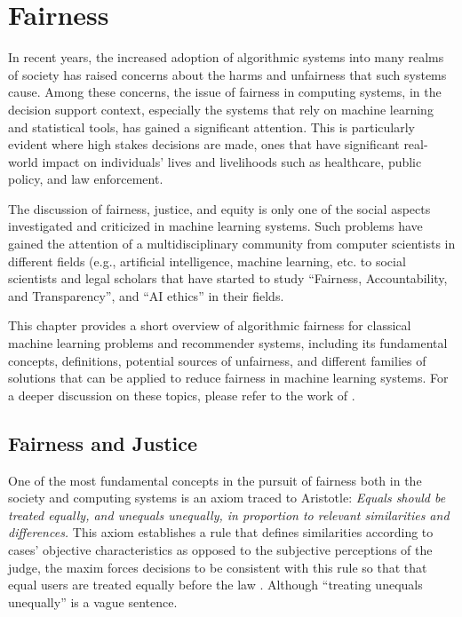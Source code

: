 \chapter{Fairness}
\label{ch:fairness}

In recent years, the increased adoption of algorithmic systems into many realms of society has raised concerns about the harms and unfairness that such systems cause. Among these concerns, the issue of fairness in computing systems, in the decision support context, especially the systems that rely on machine learning and statistical tools, has gained a significant attention\cite{mitchell2021algorithmic}. This is particularly evident where high stakes decisions are made, ones that have significant real-world impact on individuals’ lives and livelihoods such as healthcare, public policy, and law enforcement.

The discussion of fairness, justice, and equity is only one of the social aspects investigated and criticized in machine learning systems. Such problems have gained the attention of a multidisciplinary community from computer scientists in different fields (e.g., artificial intelligence, machine learning, etc. to social scientists and legal scholars that have started to study ``Fairness, Accountability, and Transparency'', and ``AI ethics'' in their fields.

This chapter provides a short overview of algorithmic fairness for classical machine learning problems and recommender systems, including its fundamental concepts, definitions, potential sources of unfairness, and different families of solutions that can be applied to reduce fairness in machine learning systems. For a deeper discussion on these topics, please refer to the work of \cite{mitchell2021algorithmic,barocas2016big,barocas2018fairness}.

\section{Fairness and Justice}
\label{sec:fair_&_justice}
    
    One of the most fundamental concepts in the pursuit of fairness both in the society and computing systems is an axiom traced to Aristotle: \textit{Equals should be treated equally, and unequals unequally, in proportion to relevant similarities and differences.} This axiom establishes a rule that defines similarities according to cases’ objective characteristics as opposed to the subjective perceptions of the judge, the maxim forces decisions to be consistent with this rule so that that equal users are treated equally before the law \cite{Gosepath2011equality}. Although ``treating unequals unequally'' is a vague sentence. 
    
